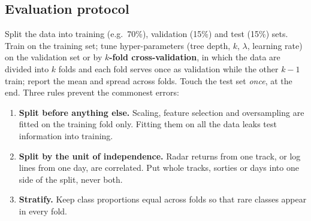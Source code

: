 \documentclass[11pt]{article}
\begin{document}
\subsection{Evaluation protocol}
Split the data into training (e.g.\ 70\%), validation (15\%) and test (15\%) sets. Train on the training set; tune hyper-parameters (tree depth, $k$, $\lambda$, learning rate) on the validation set or by \textbf{$k$-fold cross-validation}, in which the data are divided into $k$ folds and each fold serves once as validation while the other $k-1$ train; report the mean and spread across folds. Touch the test set \emph{once}, at the end. Three rules prevent the commonest errors:
\begin{enumerate}
\item \textbf{Split before anything else.} Scaling, feature selection and oversampling are fitted on the training fold only. Fitting them on all the data leaks test information into training.
\item \textbf{Split by the unit of independence.} Radar returns from one track, or log lines from one day, are correlated. Put whole tracks, sorties or days into one side of the split, never both.
\item \textbf{Stratify.} Keep class proportions equal across folds so that rare classes appear in every fold.
\end{enumerate}
\end{document}
